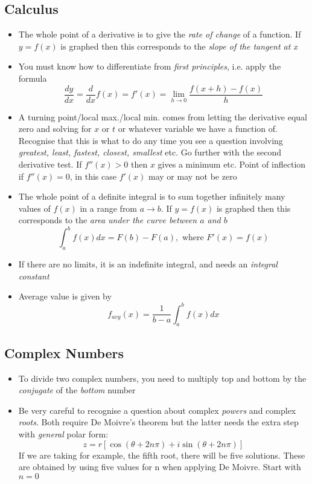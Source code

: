 \documentclass[10pt,a4paper]{article}
\begin{document}
\subsection{Calculus}
\begin{itemize}
    \item The whole point of a derivative is to give the \textit{rate of change} of a function. If $y=f(x)$ is graphed then this corresponds to the \textit{slope of the tangent at x}
    \item You must know how to differentiate from \textit{first principles}, i.e. apply the formula
        \begin{equation}
            \frac{dy}{dx} = \frac{d}{dx}f(x)= f'(x)=  \lim_{h\to 0} \frac{f(x+h) - f(x)}{h}
        \end{equation}
    \item A turning point/local max./local min. comes from letting the derivative equal zero and solving for $x$ or $t$ or whatever variable we have a function of. Recognise that this is what to do any time you see a question involving \textit{greatest, least, fastest, closest, smallest} etc. Go further with the second derivative test. If $f''(x)>0$ then $x$ gives a minimum etc. Point of inflection if $f''(x)=0$, in this case $f'(x)$ may or may not be zero
    \item The whole point of a definite integral is to sum together infinitely many values of $f(x)$ in a range from $a \to b$.  If $y=f(x)$ is graphed then this corresponds to the \textit{area under the curve between $a$ and $b$}
        \begin{equation}
            \int_a^b f(x) dx = F(b)-F(a), \text{ where }F'(x) = f(x)
        \end{equation}
    \item If there are no limits, it is an indefinite integral, and needs an \textit{integral constant}
    \item Average value is given by 
        \begin{equation}
            f_{avg}(x)=\frac{1}{b-a} \int_a^b f(x) dx
        \end{equation}
\end{itemize}
\subsection{Complex Numbers}

\begin{itemize}
    \item To divide two complex numbers, you need to multiply top and bottom by the \textit{conjugate} of the \textit{bottom} number
    \item Be very careful to recognise a question about complex \textit{powers} and complex \textit{roots}. Both require De Moivre's theorem but the latter needs the extra step with \textit{general} polar form:
    \begin{equation}
        z=r [\cos(\theta+2n\pi)+i\sin(\theta+2n\pi)]
    \end{equation}
    If we are taking for example, the fifth root, there will be five solutions. These are obtained by using five values for n when applying De Moivre. Start with $n=0$
\end{itemize}
\end{document}
